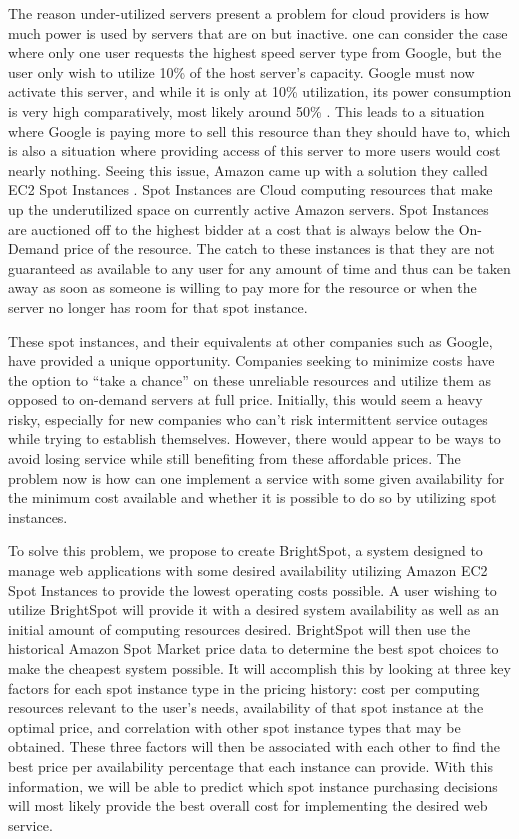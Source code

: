 \documentclass[thesis,proposal]{umassthesis}  %
\begin{document}
The reason under-utilized servers present a problem for cloud providers is how much power is used by servers that are on but inactive. one can consider the case where only one user requests the highest speed server type from Google, but the user only wish to utilize 10\% of the host server's capacity. Google must now activate this server, and while it is only at 10\% utilization, its power consumption is very high comparatively, most likely around 50\% \cite{serverPowerUsage}. This leads to a situation where Google is paying more to sell this resource than they should have to, which is also a situation where providing access of this server to more users would cost nearly nothing. Seeing this issue, Amazon came up with a solution they called EC2 Spot Instances \cite{awsSpotInfo}. Spot Instances are Cloud computing resources that make up the underutilized space on currently active Amazon servers. Spot Instances are auctioned off to the highest bidder at a cost that is always below the On-Demand price of the resource. The catch to these instances is that they are not guaranteed as available to any user for any amount of time and thus can be taken away as soon as someone is willing to pay more for the resource or when the server no longer has room for that spot instance.\par

These spot instances, and their equivalents at other companies such as Google, have provided a unique opportunity. Companies seeking to minimize costs have the option to “take a chance” on these unreliable resources and utilize them as opposed to on-demand servers at full price. Initially, this would seem a heavy risky, especially for new companies who can’t risk intermittent service outages while trying to establish themselves. However, there would appear to be ways to avoid losing service while still benefiting from these affordable prices. The problem now is how can one implement a service with some given availability for the minimum cost available and whether it is possible to do so by utilizing spot instances.\par

To solve this problem, we propose to create BrightSpot, a system designed to manage web applications with some desired availability utilizing Amazon EC2 Spot Instances to provide the lowest operating costs possible. A user wishing to utilize BrightSpot will provide it with a desired system availability as well as an initial amount of computing resources desired. BrightSpot will then use the historical Amazon Spot Market price data to determine the best spot choices to make the cheapest system possible. It will accomplish this by looking at three key factors for each spot instance type in the pricing history: cost per computing resources relevant to the user's needs, availability of that spot instance at the optimal price, and correlation with other spot instance types that may be obtained. These three factors will then be associated with each other to find the best price per availability percentage that each instance can provide. With this information, we will be able to predict which spot instance purchasing decisions will most likely provide the best overall cost for implementing the desired web service.\par
\end{document}
